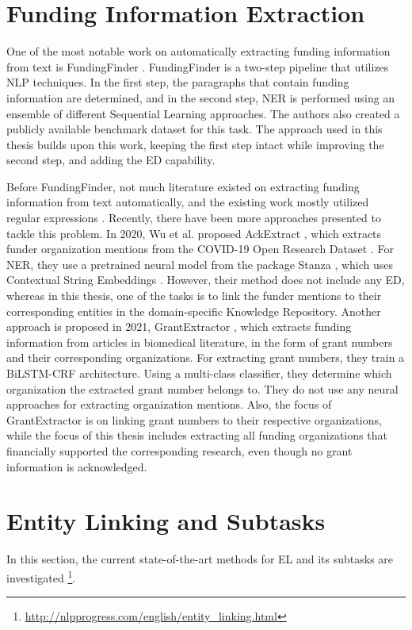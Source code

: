 \documentclass{report}
\theoremstyle{definition}
\theoremstyle{remark}
\begin{document}
\section{Funding Information Extraction}
\label{FundingDataExtraction}

    One of the most notable work on automatically extracting funding information from text is FundingFinder \cite{ElsPaper}. FundingFinder is a two-step pipeline that utilizes NLP techniques. In the first step, the paragraphs that contain funding information are determined, and in the second step, NER is performed using an ensemble of different Sequential Learning approaches. The authors also created a publicly available benchmark dataset for this task. The approach used in this thesis builds upon this work, keeping the first step intact while improving the second step, and adding the ED capability. 
    
    Before FundingFinder, not much literature existed on extracting funding information from text automatically, and the existing work mostly utilized regular expressions \cite{ElsPaper}. Recently, there have been more approaches presented to tackle this problem. In 2020, Wu et al. proposed AckExtract  \cite{AckExtract}, which extracts funder organization mentions from the COVID-19 Open Research Dataset \cite{CORD}. For NER, they use a pretrained neural model from the package Stanza \cite{stanza}, which uses Contextual String Embeddings \cite{flairpaper}. However, their method does not include any ED, whereas in this thesis, one of the tasks is to link the funder mentions to their corresponding entities in the domain-specific Knowledge Repository. Another approach is proposed in 2021, GrantExtractor \cite{GrantExtractor}, which extracts funding information from articles in biomedical literature, in the form of grant numbers and their corresponding organizations. For extracting grant numbers, they train a BiLSTM-CRF \cite{BiLSTMCRF} architecture. Using a multi-class classifier, they determine which organization the extracted grant number belongs to. They do not use any neural approaches for extracting organization mentions. Also, the focus of GrantExtractor is on linking grant numbers to their respective organizations, while the focus of this thesis includes extracting all funding organizations that financially supported the corresponding research, even though no grant information is acknowledged.

\section{Entity Linking and Subtasks}
\label{sota}
In this section, the current state-of-the-art methods for EL and its subtasks are investigated \footnote{\url{http://nlpprogress.com/english/entity_linking.html}}.
\end{document}

